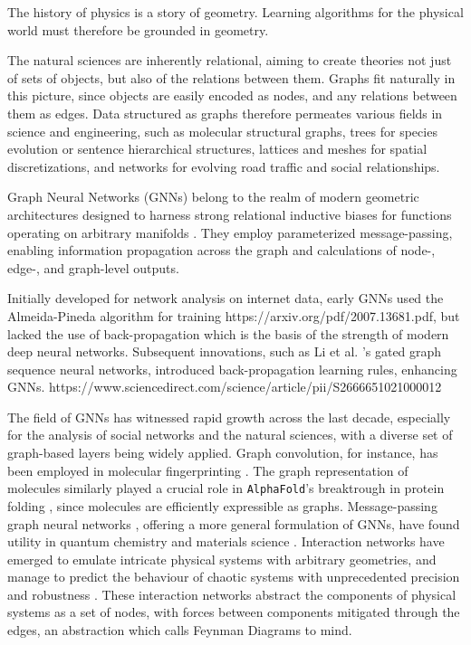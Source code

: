 \documentclass[twocolumn,floatfix]{aastex63}
\begin{document}
The history of physics is a story of geometry. Learning algorithms for the physical world must therefore be grounded in geometry.

The natural sciences are inherently relational, aiming to create theories not just of sets of objects, but also of the relations between them. Graphs fit naturally in this picture, since objects are easily encoded as nodes, and any relations between them as edges. Data structured as graphs therefore permeates various fields in science and engineering, such as molecular structural graphs, trees for species evolution or sentence hierarchical structures, lattices and meshes for spatial discretizations, and networks for evolving road traffic and social relationships.

Graph Neural Networks (GNNs) belong to the realm of modern geometric architectures designed to harness strong relational inductive biases for functions operating on arbitrary manifolds \citep{Bronstein2021_theGNN_bible}. They employ parameterized message-passing, enabling information propagation across the graph and calculations of node-, edge-, and graph-level outputs.

Initially developed for network analysis on internet data, early GNNs used the Almeida-Pineda algorithm for training \cite{physicsreviewpaper} https://arxiv.org/pdf/2007.13681.pdf, but lacked the use of back-propagation which is the basis of the strength of modern deep neural networks. Subsequent innovations, such as Li et al. \cite{physicsreviewpaper} 's gated graph sequence neural networks, introduced back-propagation learning rules, enhancing GNNs.
https://www.sciencedirect.com/science/article/pii/S2666651021000012

The field of GNNs has witnessed rapid growth across the last decade, especially for the analysis of social networks and the natural sciences, with a diverse set of graph-based layers being widely applied. Graph convolution, for instance, has been employed in molecular fingerprinting \cite{checkphysicsreview, KipfWellingGraphConvolution_2016}. The graph representation of molecules similarly played a crucial role in \texttt{AlphaFold}'s breaktrough in protein folding \citep{AlphaFold}, since molecules are efficiently expressible as graphs. Message-passing graph neural networks \citep{Velickovic2022_message_passing_all}, offering a more general formulation of GNNs, have found utility in quantum chemistry \citep{checkphysicsreview} and materials science . Interaction networks have emerged to emulate intricate physical systems with arbitrary geometries, and manage to predict the behaviour of chaotic systems with unprecedented precision and robustness \citep{Battaglia2018_inductive_biases, Pfaff2020_GNN_mesh_based_simulation, LamBattaglia2022_weather_GraphCast}. These interaction networks abstract the components of physical systems as a set of nodes, with forces between components mitigated through the edges, an abstraction which calls Feynman Diagrams to mind. \\
\end{document}
